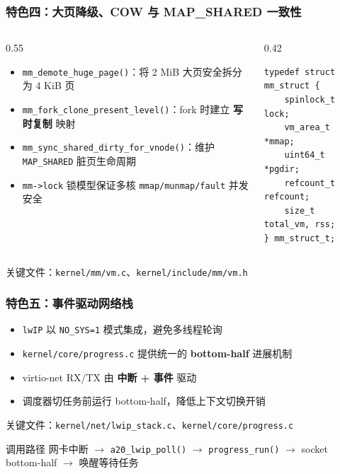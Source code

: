 \documentclass[aspectratio=1610]{beamer}
\newcommand{\code}[1]{\texttt{\footnotesize #1}}
\newcommand{\high}[1]{\textbf{\textcolor{ThemeColor}{#1}}}
\begin{document}
\begin{frame}[fragile]
    \frametitle{特色四：大页降级、COW 与 MAP\_SHARED 一致性}
    \begin{columns}
        \begin{column}{0.55\textwidth}
            \begin{itemize}
                \item \code{mm\_demote\_huge\_page()}：将 2 MiB 大页安全拆分为 4 KiB 页
                \item \code{mm\_fork\_clone\_present\_level()}：fork 时建立 \high{写时复制} 映射
                \item \code{mm\_sync\_shared\_dirty\_for\_vnode()}：维护 \code{MAP\_SHARED} 脏页生命周期
                \item \code{mm->lock} 锁模型保证多核 \code{mmap/munmap/fault} 并发安全
            \end{itemize}
        \end{column}
        \begin{column}{0.42\textwidth}
            \begin{lstlisting}[basicstyle=\ttfamily\tiny]
typedef struct mm_struct {
    spinlock_t lock;
    vm_area_t *mmap;
    uint64_t  *pgdir;
    refcount_t refcount;
    size_t total_vm, rss;
} mm_struct_t;
            \end{lstlisting}
        \end{column}
    \end{columns}
    \vspace{0.3em}
    \small 关键文件：\code{kernel/mm/vm.c}、\code{kernel/include/mm/vm.h}
\end{frame}

\begin{frame}
    \frametitle{特色五：事件驱动网络栈}
    \begin{itemize}
        \item \code{lwIP} 以 \code{NO\_SYS=1} 模式集成，避免多线程轮询
        \item \code{kernel/core/progress.c} 提供统一的 \high{bottom-half} 进展机制
        \item virtio-net RX/TX 由 \high{中断 + 事件} 驱动
        \item 调度器切任务前运行 bottom-half，降低上下文切换开销
    \end{itemize}
    \vspace{0.3em}
    \small 关键文件：\code{kernel/net/lwip\_stack.c}、\code{kernel/core/progress.c}
    \begin{block}{调用路径}
        \footnotesize
        网卡中断 $\rightarrow$ \code{a20\_lwip\_poll()} $\rightarrow$ \code{progress\_run()} $\rightarrow$ socket bottom-half $\rightarrow$ 唤醒等待任务
    \end{block}
\end{frame}
\end{document}
